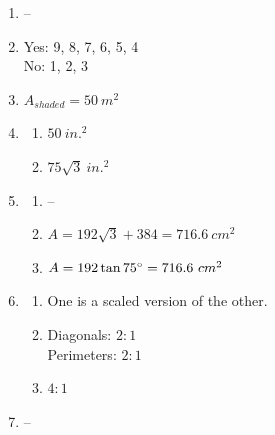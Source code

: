 \documentclass{article}
\begin{document}
\begin{enumerate}
	\begin{enumerate}
	
	\item 32
	
	\item 24
	
	\end{enumerate}
	
\item --

\item Yes: 9, 8, 7, 6, 5, 4 \\
	No: 1, 2, 3
	
\item $A_{shaded} = 50 \ m^2$

\item

	\begin{enumerate}
	
	\item $50 \ in.^2$
	
	\item $75\sqrt{3} \ in.^2$
	
	\end{enumerate}
	
\item

	\begin{enumerate}
	
	\item --
	
	\item $A = 192 \sqrt{3} + 384 = 716.6 \ cm^2$
	
	\item $A = 192\tan{75\degree} = 716.6 \ cm^2$
	
	\end{enumerate}
	
\item

	\begin{enumerate}
	
	\item One is a scaled version of the other.
	
	\item Diagonals: $2:1$ \\
		Perimeters: $2:1$
		
	\item $4:1$
	
	\end{enumerate}
	
\item --


\end{enumerate}
\end{document}
